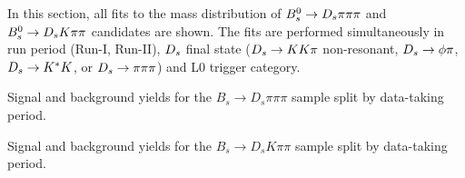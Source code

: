 \setcounter{figure}{0}
\setcounter{table}{0}

\renewcommand{\thefigure}{D.\arabic{figure}}
\renewcommand{\thetable}{D.\arabic{table}}

In this section, all fits to the mass distribution of ${{B}^0_{s}}\rightarrow{\ensuremath{{D}_{s}}}{\ensuremath{\pi}}{\ensuremath{\pi}}{\ensuremath{\pi}}$ and ${{B}^0_{s}}\rightarrow{\ensuremath{{D}_{s}}}{\ensuremath{K}}{\ensuremath{\pi}}{\ensuremath{\pi}}$ candidates are shown. 
The fits are performed simultaneously 
in run period (Run-I, Run-II), 
${{D}_{s}}$ final state  (${{D}_{s}}\rightarrow{\ensuremath{K}}{\ensuremath{K}}{\ensuremath{\pi}}$ non-resonant, ${{D}_{s}}\rightarrow\phi\pi$, ${{D}_{s}}\rightarrow{\ensuremath{{K}^*}}{\ensuremath{K}}$, or ${{D}_{s}}\rightarrow{\ensuremath{\pi}}{\ensuremath{\pi}}{\ensuremath{\pi}}$) 
and \textsf{L0} trigger category. 

\begin{table}[h]
\centering
\caption{Signal and background yields for the $B_s \to D_s \pi \pi \pi$ sample
split by data-taking period.}
 


\label{tab:massFitNormA}
\end{table}
\begin{table}[h]
\centering
\caption{Signal and background yields for the $B_s \to D_s K \pi \pi$ sample split by data-taking period.}
 


\label{tab:massFitSigA}
\end{table}

